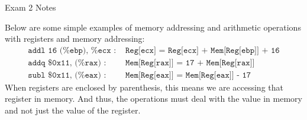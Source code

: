 \begin{examnotes}{Exam 2 Notes}
    \begin{highlight}
        Below are some simple examples of memory addressing and arithmetic operations with registers and memory addressing:
        \begin{align*}
            \texttt{addl 16 (\%ebp), \%ecx : } & \texttt{Reg[ecx] = Reg[ecx] + Mem[Reg[ebp]] + 16} \\
            \texttt{addq \$0x11, (\%rax) : } & \texttt{Mem[Reg[rax]] = 17 + Mem[Reg[rax]]} \\
            \texttt{subl \$0x11, (\%eax) : } & \texttt{Mem[Reg[eax]] = Mem[Reg[eax]] - 17}
        \end{align*}
        When registers are enclosed by parenthesis, this means we are accessing that register in memory. And thus, the operations must deal with the value in memory and not just the value of the register.
    \end{highlight}
\end{examnotes}

